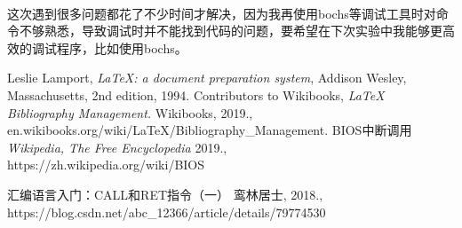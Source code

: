 \documentclass[a4paper, 11pt]{article} %
\begin{document}
\paragraph{}
这次遇到很多问题都花了不少时间才解决，因为我再使用bochs等调试工具时对命令不够熟悉，导致调试时并不能找到代码的问题，要希望在下次实验中我能够更高效的调试程序，比如使用bochs。
\begin{thebibliography}{99}
  
  Leslie Lamport,
  \textit{\LaTeX: a document preparation system},
  Addison Wesley, Massachusetts,
  2nd edition,
  1994.
  Contributors to Wikibooks,
  \textit{LaTeX Bibliography Management.}
  Wikibooks,
  2019., \\
  en.wikibooks.org/wiki/LaTeX/Bibliography\_Management.
  BIOS中断调用
  \textit{Wikipedia, The Free Encyclopedia}
  2019., \\
  https://zh.wikipedia.org/wiki/BIOS%
  
  汇编语言入门：CALL和RET指令（一）
  鸾林居士,
  2018., \\
  https://blog.csdn.net/abc_12366/article/details/79774530  

\end{thebibliography}

\clearpage
\end{document}
